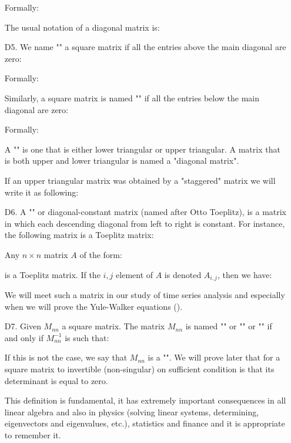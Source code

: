 \begin{enumerate}
		Formally:
		
		The usual notation of a diagonal matrix is:
		
		
		\item[D5.] We name "" a square matrix if all the entries above the main diagonal are zero:
		
		Formally:
		 
		 Similarly, a square matrix is named "" if all the entries below the main diagonal are zero:
		 
		Formally:
		 
		A "" is one that is either lower triangular or upper triangular. A matrix that is both upper and lower triangular is named a "diagonal matrix".
		
		If an upper triangular matrix was obtained by a "staggered" matrix we will write it as following:
		
		
		\item[D6.] A "\label{Toeplitz matrix}" or diagonal-constant matrix (named after Otto Toeplitz), is a matrix in which each descending diagonal from left to right is constant. For instance, the following matrix is a Toeplitz matrix:
		
		Any $n\times n$ matrix $A$ of the form:
		
		is a Toeplitz matrix. If the $i,j$ element of $A$ is denoted $A_{i,j}$, then we have:
		
		We will meet such a matrix in our study of time series analysis and especially when we will prove the Yule-Walker equations ().
		
		\item[D7.] Given $M_{nn}$ a square matrix. The matrix $M_{nn}$ is named "" or "" or "" if and only if $M_{nn}^{-1}$ is such that:
		
		If this is not the case, we say that $M_{nn}$ is a "". We will prove later that for a square matrix to invertible (non-singular) on sufficient condition is that its determinant is equal to zero.
		
		This definition is fundamental, it has extremely important consequences in all linear algebra and also in physics (solving linear systems, determining, eigenvectors and eigenvalues, etc.), statistics and finance and it is appropriate to remember it.
		

\end{enumerate}

